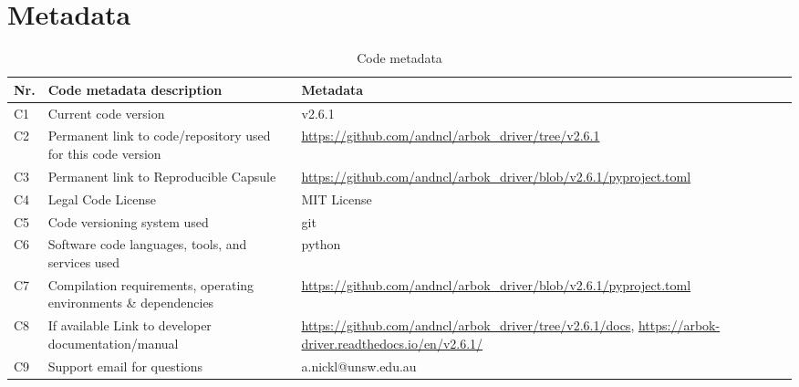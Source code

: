 \documentclass[numbers, preprint, twocolumn,10pt]{elsarticle}
\begin{document}
\section*{Metadata}
\label{tab:metadata}
\begin{table}[H]
    \centering
    \begin{tabular}{|l|p{6.5cm}|p{6.5cm}|}
        \hline
        \textbf{Nr.} & \textbf{Code metadata description} & \textbf{Metadata} \\
        \hline
        C1 & Current code version & v2.6.1 \\
        \hline
        C2 & Permanent link to code/repository used for this code version & \url{https://github.com/andncl/arbok_driver/tree/v2.6.1} \\
        \hline
        C3 & Permanent link to Reproducible Capsule & \url{https://github.com/andncl/arbok_driver/blob/v2.6.1/pyproject.toml}\\
        \hline
        C4 & Legal Code License & MIT License \\
        \hline
        C5 & Code versioning system used & git\\
        \hline
        C6 & Software code languages, tools, and services used & python\\
        \hline
        C7 & Compilation requirements, operating environments \& dependencies & \url{https://github.com/andncl/arbok_driver/blob/v2.6.1/pyproject.toml} \\
        \hline
        C8 & If available Link to developer documentation/manual & \url{https://github.com/andncl/arbok_driver/tree/v2.6.1/docs}, \url{https://arbok-driver.readthedocs.io/en/v2.6.1/} \\
        \hline
        C9 & Support email for questions & a.nickl@unsw.edu.au\\
        \hline
    \end{tabular}
    \caption{Code metadata}
    \label{codeMetadata}
\end{table}

\clearpage
\twocolumn
\linenumbers
\end{document}
